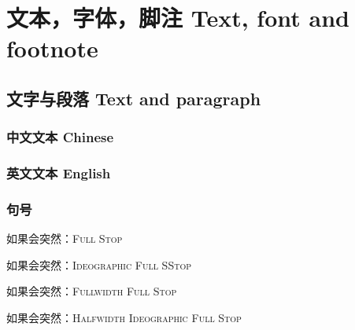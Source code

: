 \documentclass[twoside]{fduthesis}
\begin{document}
\mainmatter
\chapter{文本，字体，脚注 \quad Text, font and footnote}
\section{文字与段落 Text and paragraph}
\subsection{中文文本 Chinese}
\zhlipsum

\subsection{英文文本 English}
\kant

\clearpage

%
%
%

\subsection{句号}
如果会突然：\textsc{Full Stop} \par
如果会突然：\textsc{Ideographic Full SStop} \par
如果会突然：\textsc{Fullwidth Full Stop} \par
如果会突然：\textsc{Halfwidth Ideographic Full Stop} \par

\clearpage
\end{document}

